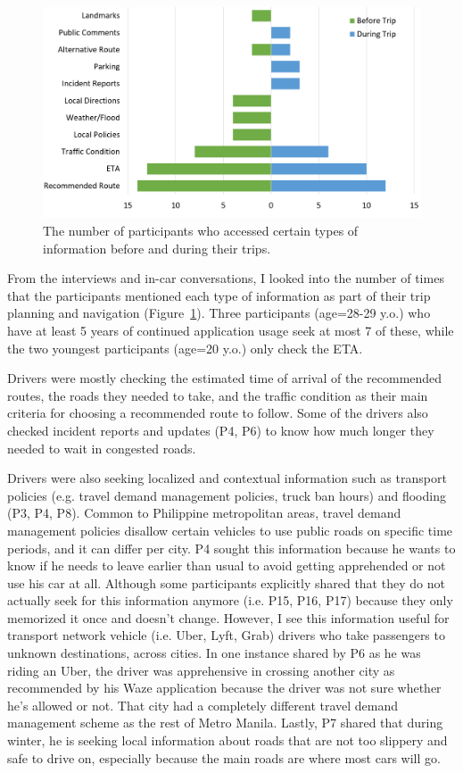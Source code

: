 \begin{figure}[t]
  \centering
  \includegraphics[scale=0.4]{figures/s1-info-sought.png}
  \caption{The number of participants who accessed certain types of information before and during their trips.}
  \label{fig:s1-info_sought}
\end{figure}

From the interviews and in-car conversations, I looked into the number of times that the participants mentioned each type of information as part of their trip planning and navigation (Figure~\ref{fig:s1-info_sought}). Three participants (age=28-29 y.o.) who have at least 5 years of continued application usage seek at most 7 of these, while the two youngest participants (age=20 y.o.) only check the ETA.

Drivers were mostly checking the estimated time of arrival of the recommended routes, the roads they needed to take, and the traffic condition as their main criteria for choosing a recommended route to follow. Some of the drivers also checked incident reports and updates (P4, P6) to know how much longer they needed to wait in congested roads. 

Drivers were also seeking localized and contextual information such as transport policies (e.g. travel demand management policies, truck ban hours) and flooding (P3, P4, P8). Common to Philippine metropolitan areas, travel demand management policies disallow certain vehicles to use public roads on specific time periods, and it can differ per city. P4 sought this information because he wants to know if he needs to leave earlier than usual to avoid getting apprehended or not use his car at all. Although some participants explicitly shared that they do not actually seek for this information anymore (i.e. P15, P16, P17) because they only memorized it once and doesn't change. However, I see this information useful for transport network vehicle (i.e. Uber, Lyft, Grab) drivers who take passengers to unknown destinations, across cities. In one instance shared by P6 as he was riding an Uber, the driver was apprehensive in crossing another city as recommended by his Waze application because the driver was not sure whether he's allowed or not. That city had a completely different travel demand management scheme as the rest of Metro Manila. Lastly, P7 shared that during winter, he is seeking local information about roads that are not too slippery and safe to drive on, especially because the main roads are where most cars will go. 

